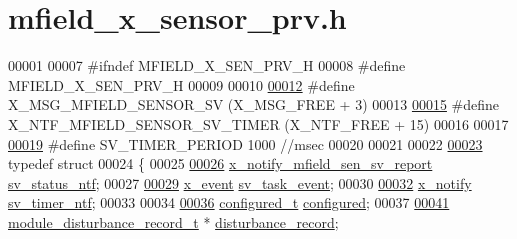 \hypertarget{a00025_source}{\section{mfield\+\_\+x\+\_\+sensor\+\_\+prv.\+h}
\label{a00025_source}
}

\begin{DoxyCode}
00001 
00007 \textcolor{preprocessor}{#ifndef MFIELD\_X\_SEN\_PRV\_H}
00008 \textcolor{preprocessor}{#define MFIELD\_X\_SEN\_PRV\_H}
00009 
00010 
\hypertarget{a00025_source_l00012}{}\hyperlink{a00025_a510020575747f82c587c5485b8619f78}{00012} \textcolor{preprocessor}{#define X\_MSG\_MFIELD\_SENSOR\_SV                      (X\_MSG\_FREE + 3)}
00013 
\hypertarget{a00025_source_l00015}{}\hyperlink{a00025_ad9eede821e7c65d58f1806af4bd6bf29}{00015} \textcolor{preprocessor}{#define X\_NTF\_MFIELD\_SENSOR\_SV\_TIMER                                (X\_NTF\_FREE + 15)}
00016 
00017 
\hypertarget{a00025_source_l00019}{}\hyperlink{a00025_a8a535456285f4602701c814d7b69cc68}{00019} \textcolor{preprocessor}{#define SV\_TIMER\_PERIOD                             1000  //msec}
00020 
00021 
00022 
\hypertarget{a00025_source_l00023}{}\hyperlink{a00025}{00023} \textcolor{keyword}{typedef} \textcolor{keyword}{struct}
00024 \{
00025 
\hypertarget{a00025_source_l00026}{}\hyperlink{a00025_a752b00333ec308e07c6bd41aa9a01e73}{00026}        \hyperlink{a00019_dc/d41/a00862}{x\_notify\_mfield\_sen\_sv\_report}             
      \hyperlink{a00025_a752b00333ec308e07c6bd41aa9a01e73}{sv\_status\_ntf};
00027 
\hypertarget{a00025_source_l00029}{}\hyperlink{a00025_a43c345f39ea3aefbb60ef1ef57fe5d83}{00029}       \hyperlink{a00036_de/d37/a00849}{x\_event}                          \hyperlink{a00025_a43c345f39ea3aefbb60ef1ef57fe5d83}{sv\_task\_event};
00030 
\hypertarget{a00025_source_l00032}{}\hyperlink{a00025_ada91b200053f2d93e3639dc4ee3415b4}{00032}       \hyperlink{a00036_df/d4c/a00851}{x\_notify}                                    \hyperlink{a00025_ada91b200053f2d93e3639dc4ee3415b4}{sv\_timer\_ntf};
00033 
00034 
\hypertarget{a00025_source_l00036}{}\hyperlink{a00025_a94b2d1f6ea4ab334c74d24984dd27843}{00036}       \hyperlink{a00021_d6/d9c/a00352}{configured\_t}                               \hyperlink{a00025_a94b2d1f6ea4ab334c74d24984dd27843}{configured};
00037 
\hypertarget{a00025_source_l00041}{}\hyperlink{a00025_ac9b38e2c1d3f1013a88d33506c754152}{00041}       \hyperlink{a00028}{module\_disturbance\_record\_t}                *
      \hyperlink{a00025_ac9b38e2c1d3f1013a88d33506c754152}{disturbance\_record};

\end{DoxyCode}
